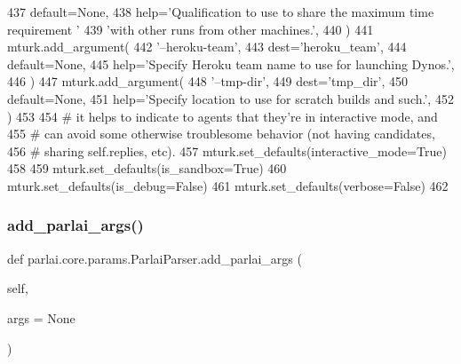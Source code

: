 \begin{DoxyCode}
437             default=\textcolor{keywordtype}{None},
438             help=\textcolor{stringliteral}{'Qualification to use to share the maximum time requirement '}
439             \textcolor{stringliteral}{'with other runs from other machines.'},
440         )
441         mturk.add\_argument(
442             \textcolor{stringliteral}{'--heroku-team'},
443             dest=\textcolor{stringliteral}{'heroku\_team'},
444             default=\textcolor{keywordtype}{None},
445             help=\textcolor{stringliteral}{'Specify Heroku team name to use for launching Dynos.'},
446         )
447         mturk.add\_argument(
448             \textcolor{stringliteral}{'--tmp-dir'},
449             dest=\textcolor{stringliteral}{'tmp\_dir'},
450             default=\textcolor{keywordtype}{None},
451             help=\textcolor{stringliteral}{'Specify location to use for scratch builds and such.'},
452         )
453 
454         \textcolor{comment}{# it helps to indicate to agents that they're in interactive mode, and}
455         \textcolor{comment}{# can avoid some otherwise troublesome behavior (not having candidates,}
456         \textcolor{comment}{# sharing self.replies, etc).}
457         mturk.set\_defaults(interactive\_mode=\textcolor{keyword}{True})
458 
459         mturk.set\_defaults(is\_sandbox=\textcolor{keyword}{True})
460         mturk.set\_defaults(is\_debug=\textcolor{keyword}{False})
461         mturk.set\_defaults(verbose=\textcolor{keyword}{False})
462 
\end{DoxyCode}
\mbox{\label{classparlai_1_1core_1_1params_1_1ParlaiParser_a3dfaa7781346d8c974d60684e81cb705}} 
\subsubsection{\texorpdfstring{add\+\_\+parlai\+\_\+args()}{add\_parlai\_args()}}
{\footnotesize\ttfamily def parlai.\+core.\+params.\+Parlai\+Parser.\+add\+\_\+parlai\+\_\+args (\begin{DoxyParamCaption}\item[{}]{self,  }\item[{}]{args = {\ttfamily None} }\end{DoxyParamCaption})}

